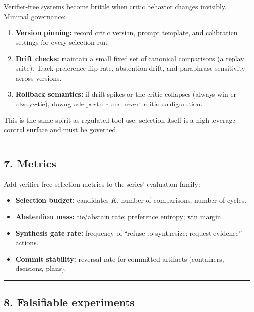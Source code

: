 \documentclass[11pt]{article}
\providecommand{\tightlist}{%
  \setlength{\itemsep}{0pt}\setlength{\parskip}{0pt}}
\begin{document}
Verifier-free systems become brittle when critic behavior changes invisibly. Minimal governance:

\begin{enumerate}
\def\labelenumi{\arabic{enumi})}
\tightlist
\item \textbf{Version pinning:} record critic version, prompt template, and calibration settings for every selection run.
\item \textbf{Drift checks:} maintain a small fixed set of canonical comparisons (a replay suite). Track preference flip rate, abstention drift, and paraphrase sensitivity across versions.
\item \textbf{Rollback semantics:} if drift spikes or the critic collapses (always-win or always-tie), downgrade posture and revert critic configuration.
\end{enumerate}

This is the same spirit as regulated tool use: selection itself is a high-leverage control surface and must be governed.

\begin{center}\rule{0.5\linewidth}{0.5pt}\end{center}

\hypertarget{metrics}{%
\subsection{7. Metrics}\label{metrics}}

Add verifier-free selection metrics to the series' evaluation family:

\begin{itemize}
\tightlist
\item \textbf{Selection budget:} candidates $K$, number of comparisons, number of cycles.
\item \textbf{Abstention mass:} tie/abstain rate; preference entropy; win margin.
\item \textbf{Synthesis gate rate:} frequency of ``refuse to synthesize; request evidence'' actions.
\item \textbf{Commit stability:} reversal rate for committed artifacts (containers, decisions, plans).
\end{itemize}

\begin{center}\rule{0.5\linewidth}{0.5pt}\end{center}

\hypertarget{experiments}{%
\subsection{8. Falsifiable experiments}\label{experiments}}
\end{document}

